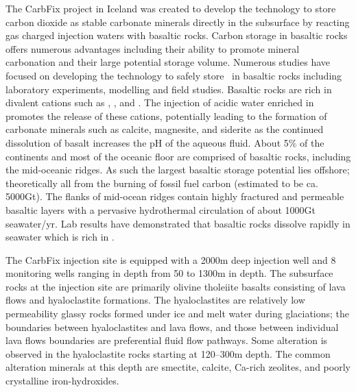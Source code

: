 \documentclass[nofonts,x11names]{tufte-handout}
\begin{document}
\noindent The
CarbFix
project in Iceland was created to develop the technology to store carbon
dioxide as stable carbonate minerals directly in the subsurface by
reacting gas charged injection waters with basaltic rocks. Carbon
storage in basaltic rocks offers numerous advantages including their
ability to promote mineral carbonation and their large potential storage
volume. Numerous studies have focused on developing the technology to
safely store \carb~in basaltic rocks including laboratory experiments,
modelling and field studies. Basaltic rocks are rich in divalent cations
such as , , and . The injection of
acidic water enriched in  promotes the release of these
cations,
potentially leading to the formation of carbonate minerals such as
calcite, magnesite, and siderite as the continued dissolution of basalt
increases the pH of the aqueous fluid. About 5\% of the continents and
most of the oceanic floor are comprised of basaltic rocks, including the
mid-oceanic ridges. As such the largest basaltic storage potential lies
offshore; theoretically all  from the burning of fossil fuel
carbon (estimated to be ca.
5000Gt).
The flanks of mid-ocean ridges contain highly fractured and permeable
basaltic layers with a pervasive hydrothermal circulation of about
1000Gt seawater/yr. Lab results have demonstrated that basaltic rocks
dissolve rapidly in seawater which is rich in \carb.

The CarbFix injection site is equipped with a 2000m deep injection well
and 8 monitoring wells ranging in depth from 50 to 1300m in depth. The
subsurface rocks at the injection site are primarily olivine tholeiite
basalts consisting of lava flows and hyaloclastite formations. The
hyaloclastites are relatively low permeability glassy rocks formed under
ice and melt water during glaciations; the boundaries between
hyaloclastites and lava flows, and those between individual lava flows
boundaries are preferential fluid flow pathways. Some alteration is
observed in the hyaloclastite rocks starting at 120--300m depth. The
common alteration minerals at this depth are smectite, calcite, Ca-rich
zeolites, and poorly crystalline iron-hydroxides.
\end{document}
